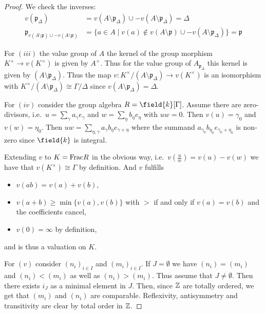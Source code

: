 \begin{proof}
  We check the inverses:
  \begin{align*}
    v(\mathfrak{p}_\Delta) &= v(A \setminus \mathfrak{p}_\Delta)\cup - v(A \setminus \mathfrak{p}_\Delta) =
    \Delta\\
    \mathfrak{p}_{v(A\setminus \mathfrak{p})\cup - v(A \setminus \mathfrak{p})} &= \{  a\in A \mid v(a)
    \notin v(A\setminus \mathfrak{p}) \cup - v(A \setminus
                                                                                  \mathfrak{p}_\Delta )\} = \mathfrak{p} 
  \end{align*}

  \vspace{\baselineskip}

  For $(iii)$ the value group of $A$ the kernel of the group morphism
  $K^\times \rightarrow v(K^\times)$ is given by $A^\times$. Thus for
  the value group of $A_{\mathfrak{p}_\Delta}$ this kernel is given by
  $(A\setminus \mathfrak{p}_\Delta)$. Thus the map
  $v\colon K^\times / (A\setminus \mathfrak{p}_\Delta) \rightarrow
  v(K^\times)$ is an isomorphism with $K^\times / (A\setminus
  \mathfrak{p}_\Delta) \cong \Gamma /\Delta$ since $v(A\setminus
  \mathfrak{p}_\Delta) = \Delta$.

  \vspace{\baselineskip}

  For $(iv)$ consider the group algebra $R=\field{k}[\Gamma]$. Assume there are
  zero-divisors, i.e.\ $u = \sum_{\gamma} a_\gamma e_\gamma$ and
  $w=\sum_{\eta} b_\eta e_\eta$ with $u w = 0$. Then $v(u)=\gamma_0$
  and $v(w) = \eta_0$. Then $uw = \sum_{\eta ,\gamma} a_\gamma b_\eta
  e_{\gamma + \eta}$ where the summand
  $a_{\gamma_0}b_{\eta_0}e_{\gamma_0 + \eta_0}$ is
  non-zero since $\field{k}$ is integral.

  Extending $v$ to $K=\mathrm{Frac} R$ in the obvious way, i.e.\
  $v(\frac{u}{w}) = v(u)- v(w)$ we have that $v(K^\times) \cong
  \Gamma$ by definition. And $v$ fulfills
  \begin{itemize}
  \item $v(a b) = v(a) + v(b)$,
  \item $v(a + b) \geq \min \{v(a),v(b)\}$ with $>$ if and only if
    $v(a)=v(b)$ and the
    coefficients cancel,
  \item $v(0) = \infty $ by definition,
  \end{itemize}
  and is thus a valuation on $K$.
  
  \vspace{\baselineskip}

  For $(v)$ consider $(n_i)_{i\in I}$ and $(m_i)_{i\in I}$. If $J = \emptyset$
  we have $(n_i)=(m_i)$ and $(n_i)< (m_i)$ as well as $(n_i)> (m_i)$.
  Thus assume that $J\neq \emptyset$. Then there exists $i_J$ as a
  minimal element in $J$. Then, since $\mathbb{Z}$ are totally ordered,
  we get that $(m_i)$ and $(n_i)$ are comparable. Reflexivity,
  antisymmetry and transitivity are clear by total order in
  $\mathbb{Z}$.


\end{proof}
